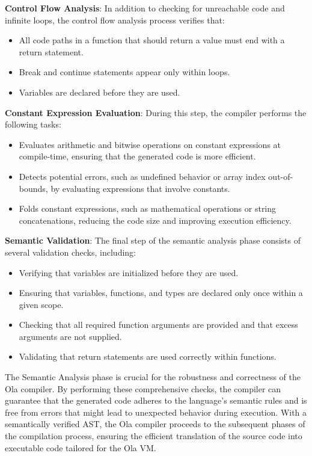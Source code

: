 \textbf{Control Flow Analysis}: In addition to checking for unreachable code and infinite loops, the control flow analysis process verifies that:

\begin{itemize}
 \item All code paths in a function that should return a value must end with a return statement.
 \item Break and continue statements appear only within loops.
 \item Variables are declared before they are used.
\end{itemize}

\textbf{Constant Expression Evaluation}: During this step, the compiler performs the following tasks:

\begin{itemize}
  \item Evaluates arithmetic and bitwise operations on constant expressions at compile-time, ensuring that the generated code is more efficient.

  \item Detects potential errors, such as undefined behavior or array index out-of-bounds, by evaluating expressions that involve constants.

  \item Folds constant expressions, such as mathematical operations or string concatenations, reducing the code size and improving execution efficiency.

\end{itemize}

\textbf{Semantic Validation}: The final step of the semantic analysis phase consists of several validation checks, including:

\begin{itemize}
  \item Verifying that variables are initialized before they are used.
  \item Ensuring that variables, functions, and types are declared only once within a given scope.
  \item Checking that all required function arguments are provided and that excess arguments are not supplied.
  \item Validating that return statements are used correctly within functions.

\end{itemize}

The Semantic Analysis phase is crucial for the robustness and correctness of the Ola compiler. By performing these comprehensive checks, the compiler can guarantee that the generated code adheres to the language's semantic rules and is free from errors that might lead to unexpected behavior during execution. With a semantically verified AST, the Ola compiler proceeds to the subsequent phases of the compilation process, ensuring the efficient translation of the source code into executable code tailored for the Ola VM.

